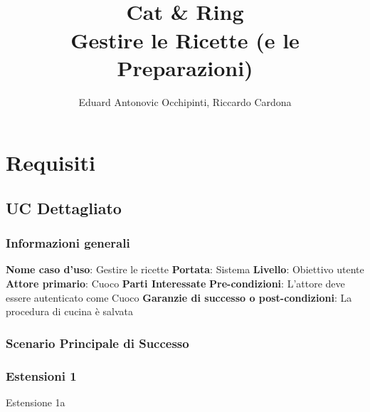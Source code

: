 \documentclass[letterpaper, italian]{report}
\title{
    \leavevmode{\texttt{[image: resources/Universita-degli-studi-di-torino-logo.png]}\newline\newline}\\
    Cat \& Ring \\
    \large Gestire le Ricette (e le Preparazioni)
}
\author{Eduard Antonovic Occhipinti, Riccardo Cardona}
\begin{document}
\maketitle

\tableofcontents

\part{Requisiti}
\chapter{UC Dettagliato}

\section*{Informazioni generali}
\textbf{Nome caso d'uso}{: Gestire le ricette}\newline
\textbf{Portata}{: Sistema}\newline
\textbf{Livello}{: Obiettivo utente}\newline
\textbf{Attore primario}{: Cuoco}\newline
\textbf{Parti Interessate}\newline
\textbf{Pre-condizioni}{: L'attore deve essere autenticato come Cuoco}\newline
\textbf{Garanzie di successo o post-condizioni}{: La procedura di cucina è salvata}

\section*{Scenario Principale di Successo}

\begin{table}[H]\centering
{}
\end{table}

\section*{Estensioni 1}
\begin{table}[H]\centering\caption{Estensione 1a}
\end{table}
\end{document}
